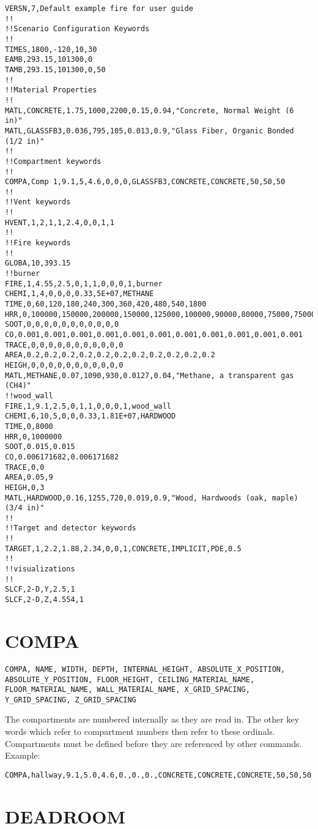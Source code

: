 \begin{lstlisting}
VERSN,7,Default example fire for user guide
!!
!!Scenario Configuration Keywords
!!
TIMES,1800,-120,10,30
EAMB,293.15,101300,0
TAMB,293.15,101300,0,50
!!
!!Material Properties
!!
MATL,CONCRETE,1.75,1000,2200,0.15,0.94,"Concrete, Normal Weight (6 in)"
MATL,GLASSFB3,0.036,795,105,0.013,0.9,"Glass Fiber, Organic Bonded (1/2 in)"
!!
!!Compartment keywords
!!
COMPA,Comp 1,9.1,5,4.6,0,0,0,GLASSFB3,CONCRETE,CONCRETE,50,50,50
!!
!!Vent keywords
!!
HVENT,1,2,1,1,2.4,0,0,1,1
!!
!!Fire keywords
!!
GLOBA,10,393.15
!!burner
FIRE,1,4.55,2.5,0,1,1,0,0,0,1,burner
CHEMI,1,4,0,0,0,0.33,5E+07,METHANE
TIME,0,60,120,180,240,300,360,420,480,540,1800
HRR,0,100000,150000,200000,150000,125000,100000,90000,80000,75000,75000
SOOT,0,0,0,0,0,0,0,0,0,0,0
CO,0.001,0.001,0.001,0.001,0.001,0.001,0.001,0.001,0.001,0.001,0.001
TRACE,0,0,0,0,0,0,0,0,0,0,0
AREA,0.2,0.2,0.2,0.2,0.2,0.2,0.2,0.2,0.2,0.2,0.2
HEIGH,0,0,0,0,0,0,0,0,0,0,0
MATL,METHANE,0.07,1090,930,0.0127,0.04,"Methane, a transparent gas (CH4)"
!!wood_wall
FIRE,1,9.1,2.5,0,1,1,0,0,0,1,wood_wall
CHEMI,6,10,5,0,0,0.33,1.81E+07,HARDWOOD
TIME,0,8000
HRR,0,1000000
SOOT,0.015,0.015
CO,0.006171682,0.006171682
TRACE,0,0
AREA,0.05,9
HEIGH,0,3
MATL,HARDWOOD,0.16,1255,720,0.019,0.9,"Wood, Hardwoods (oak, maple) (3/4 in)"
!!
!!Target and detector keywords
!!
TARGET,1,2.2,1.88,2.34,0,0,1,CONCRETE,IMPLICIT,PDE,0.5
!!
!!visualizations
!!
SLCF,2-D,Y,2.5,1
SLCF,2-D,Z,4.554,1
\end{lstlisting}


\section{COMPA}

\begin{lstlisting}
COMPA, NAME, WIDTH, DEPTH, INTERNAL_HEIGHT, ABSOLUTE_X_POSITION, ABSOLUTE_Y_POSITION, FLOOR_HEIGHT, CEILING_MATERIAL_NAME,  FLOOR_MATERIAL_NAME, WALL_MATERIAL_NAME, X_GRID_SPACING, Y_GRID_SPACING, Z_GRID_SPACING
\end{lstlisting}
The compartments are numbered internally as they are read in. The other key words which refer to compartment numbers then refer to these ordinals. Compartments must be defined before they are referenced by other commands. Example:
\begin{lstlisting}
COMPA,hallway,9.1,5.0,4.6,0.,0.,0.,CONCRETE,CONCRETE,CONCRETE,50,50,50
\end{lstlisting}

\section{DEADROOM}

